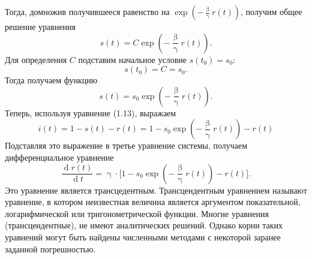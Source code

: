 \documentclass[a4paper, 14pt]{extreport}
\renewcommand{\beta}{\upbeta}
\renewcommand{\gamma}{\upgamma}
\renewcommand{\d}{\operatorname{d}}
\begin{document}
	Тогда, домножив получившееся равенство на $\exp\left(-\frac\beta \gamma r(t)\right)$, получим общее решение уравнения $$s(t) = C \exp\left(-\frac\beta \gamma r(t)\right).$$
	Для определения $C$ подставим начальное условие $s(t_0) = s_0$:
	$$s(t_0) = C = s_0.$$
	Тогда получаем функцию 
	\begin{equation}
		s(t) = s_0 \exp\left(-\frac \beta \gamma r(t)\right).
	\end{equation}
	Теперь, используя уравнение (1.13), выражаем 
	\begin{equation}
		i(t) = 1 - s(t) - r(t) = 1 - s_0 \exp\left(-\frac \beta \gamma r(t)\right) - r(t)
	\end{equation}
	Подставляя это выражение в третье уравнение системы, получаем дифференциальное уравнение 
	\begin{equation}
		\label{drdt-1}
		\dfrac{\d r(t)}{\d t} = \gamma\cdot \big[1 - s_0 \exp\left(-\frac \beta \gamma r(t)\right) - r(t)\big].
	\end{equation}
	Это уравнение является трансцедентным. Трансцендентным уравнением называют уравнение, в котором неизвестная величина является аргументом показательной, логарифмической или тригонометрической функции. Многие уравнения (трансцендентные), не имеют аналитических решений. Однако корни таких уравнений могут быть найдены численными методами с некоторой заранее заданной погрешностью.
	
\end{document}
